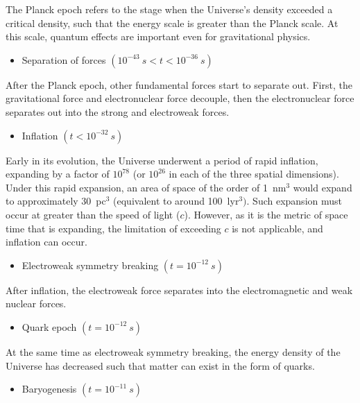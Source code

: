 \documentclass[11pt,a4paper]{book}
\providecommand{\tightlist}{%
  \setlength{\itemsep}{0pt}\setlength{\parskip}{0pt}}
\begin{document}
The Planck epoch refers to the stage when the Universe's density
exceeded a critical density, such that the energy scale is greater than
the Planck scale. At this scale, quantum effects are important even for
gravitational physics.

\begin{itemize}
\tightlist
\item
  Separation of forces \((10^{-43}~s < t < 10^{-36}~s)\)
\end{itemize}

After the Planck epoch, other fundamental forces start to separate out.
First, the gravitational force and electronuclear force decouple, then
the electronuclear force separates out into the strong and electroweak
forces.

\begin{itemize}
\tightlist
\item
  Inflation \((t < 10^{-32}~s)\)
\end{itemize}

Early in its evolution, the Universe underwent a period of rapid
inflation, expanding by a factor of \(10^{78}\) (or \(10^{26}\) in each of
the three spatial dimensions). Under this rapid expansion, an area of
space of the order of 1~nm\(^{3}\) would expand to approximately
30~pc\(^{3}\) (equivalent to around 100~lyr\(^{3})\). Such expansion must
occur at greater than the speed of light (\(c\)). However, as it is the
metric of space time that is expanding, the limitation of exceeding \(c\)
is not applicable, and inflation can occur.

\begin{itemize}
\tightlist
\item
  Electroweak symmetry breaking \((t = 10^{-12}~s)\)
\end{itemize}

After inflation, the electroweak force separates into the
electromagnetic and weak nuclear forces.

\begin{itemize}
\tightlist
\item
  Quark epoch \((t = 10^{-12}~s)\)
\end{itemize}

At the same time as electroweak symmetry breaking, the energy density of
the Universe has decreased such that matter can exist in the form of
quarks.

\begin{itemize}
\tightlist
\item
  Baryogenesis \((t = 10^{-11}~s)\)
\end{itemize}
\end{document}
